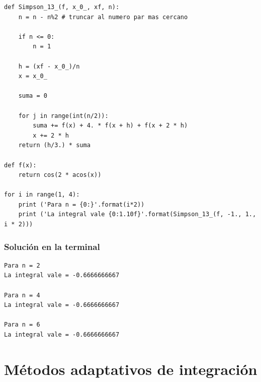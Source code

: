 \begin{frame}
\begin{lstlisting}[caption=Propuesta de código, style=FormattedNumber, basicstyle=\linespread{1.1}\ttfamily=\small, columns=fullflexible]
def Simpson_13_(f, x_0_, xf, n):
    n = n - n%2 # truncar al numero par mas cercano
     
    if n <= 0:
        n = 1
   
    h = (xf - x_0_)/n
    x = x_0_
   
    suma = 0
   
    for j in range(int(n/2)):
        suma += f(x) + 4. * f(x + h) + f(x + 2 * h)
        x += 2 * h
    return (h/3.) * suma

def f(x):
    return cos(2 * acos(x))

for i in range(1, 4):
    print ('Para n = {0:}'.format(i*2))
    print ('La integral vale {0:1.10f}'.format(Simpson_13_(f, -1., 1., i * 2)))
\end{lstlisting}
\end{frame}
\begin{frame}[fragile]
\frametitle{Solución en la terminal}
\begin{verbatim}
Para n = 2
La integral vale = -0.6666666667

Para n = 4
La integral vale = -0.6666666667

Para n = 6
La integral vale = -0.6666666667
\end{verbatim}
\end{frame}
\section{Métodos adaptativos de integración}
